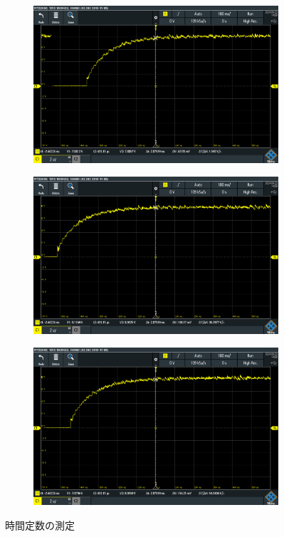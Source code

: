 \begin{figure}
	\centering
	\begin{subfigure}{0.48\columnwidth}
		\centering
		\includegraphics[width=0.8\linewidth]{src/figures/time-constant/1.PNG}
	\end{subfigure}
	\begin{subfigure}{0.48\columnwidth}
		\centering
		\includegraphics[width=0.8\linewidth]{src/figures/time-constant/2.PNG}
	\end{subfigure}
	\begin{subfigure}{0.48\columnwidth}
		\centering
		\includegraphics[width=0.8\linewidth]{src/figures/time-constant/3.PNG}
	\end{subfigure}
	\caption{時間定数の測定}\label{fig:time-constant}
\end{figure}
